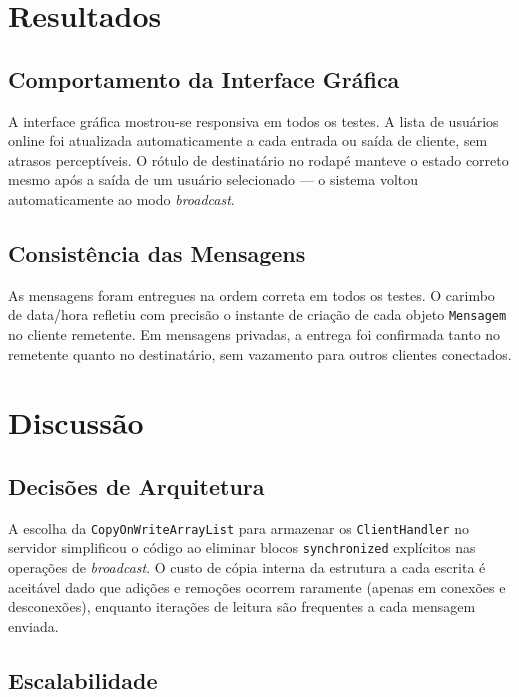 \documentclass[10pt,twocolumn,a4paper]{article}
\begin{document}
\section{Resultados}

\subsection{Comportamento da Interface Gráfica}

A interface gráfica mostrou-se responsiva em todos os testes. A lista de
usuários online foi atualizada automaticamente a cada entrada ou saída de
cliente, sem atrasos perceptíveis. O rótulo de destinatário no rodapé manteve
o estado correto mesmo após a saída de um usuário selecionado — o sistema
voltou automaticamente ao modo \textit{broadcast}.

\subsection{Consistência das Mensagens}

As mensagens foram entregues na ordem correta em todos os testes. O carimbo
de data/hora refletiu com precisão o instante de criação de cada objeto
\texttt{Mensagem} no cliente remetente. Em mensagens privadas, a entrega foi
confirmada tanto no remetente quanto no destinatário, sem vazamento para outros
clientes conectados.


\section{Discussão}

\subsection{Decisões de Arquitetura}

A escolha da \texttt{CopyOnWriteArrayList} para armazenar os
\texttt{ClientHandler} no servidor simplificou o código ao eliminar blocos
\texttt{synchronized} explícitos nas operações de \textit{broadcast}.
O custo de cópia interna da estrutura a cada escrita é aceitável dado que
adições e remoções ocorrem raramente (apenas em conexões e desconexões),
enquanto iterações de leitura são frequentes a cada mensagem enviada.

\subsection{Escalabilidade}
\end{document}
